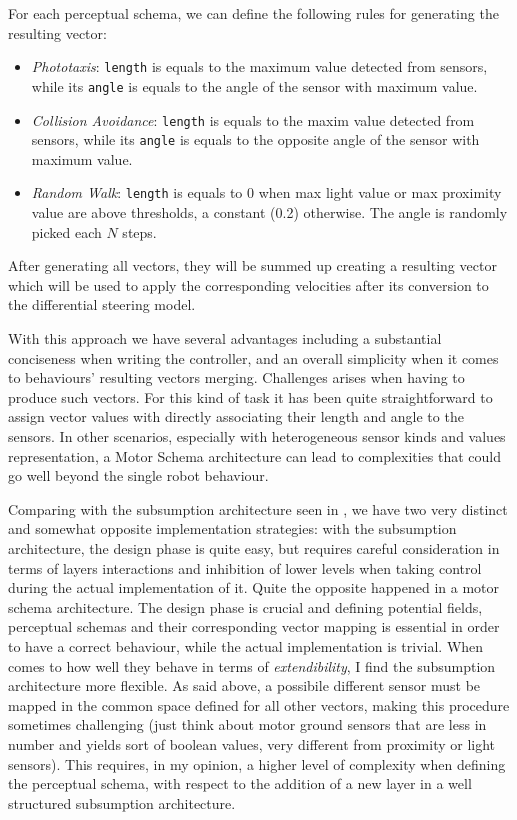 For each perceptual schema, we can define the following rules for generating
the resulting vector:
\begin{itemize}
    \item \emph{Phototaxis}: \texttt{length} is equals to the maximum value detected
        from sensors, while its \texttt{angle} is equals to the angle of the
        sensor with maximum value.

    \item \emph{Collision Avoidance}: \texttt{length} is equals to the maxim
        value detected from sensors, while its \texttt{angle} is equals to the
        opposite angle of the sensor with maximum value.

    \item \emph{Random Walk}: \texttt{length} is equals to 0 when max light value
        or max proximity value are above thresholds, a constant (0.2) otherwise.
        The angle is randomly picked each $N$ steps.
\end{itemize}

After generating all vectors, they will be summed up creating a resulting vector
which will be used to apply the corresponding velocities after its conversion
to the differential steering model.

With this approach we have several advantages including a substantial
conciseness when writing the controller, and an overall simplicity when it
comes to behaviours' resulting vectors merging. Challenges arises when having
to produce such vectors. For this kind of task it has been quite
straightforward to assign vector values with directly associating their length
and angle to the sensors. In other scenarios, especially with heterogeneous
sensor kinds and values representation, a Motor Schema architecture can lead to
complexities that could go well beyond the single robot behaviour.

Comparing with the subsumption architecture seen in , we have
two very distinct and somewhat opposite implementation strategies: with the
subsumption architecture, the design phase is quite easy, but requires careful
consideration in terms of layers interactions and inhibition of lower levels
when taking control during the actual implementation of it. Quite the opposite
happened in a motor schema architecture. The design phase is crucial and
defining potential fields, perceptual schemas and their corresponding vector
mapping is essential in order to have a correct behaviour, while the actual
implementation is trivial. When comes to how well they behave in terms of
\emph{extendibility}, I find the subsumption architecture more flexible. As
said above, a possibile different sensor must be mapped in the common space
defined for all other vectors, making this procedure sometimes challenging
(just think about motor ground sensors that are less in number and yields sort
of boolean values, very different from proximity or light sensors). This
requires, in my opinion, a higher level of complexity when defining the
perceptual schema, with respect to the addition of a new layer in a well
structured subsumption architecture.

